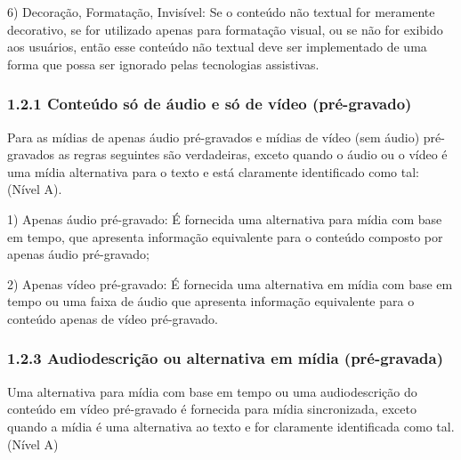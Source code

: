 \documentclass[a4paper]{article}
\begin{document}
\begin{titlepage}
\hspace{.1\textwidth} %
\begin{minipage}{.85\textwidth}
	6) Decoração, Formatação, Invisível: Se o conteúdo não textual for meramente decorativo, se for utilizado apenas para formatação visual, ou se não for exibido aos usuários, então esse conteúdo não textual deve ser implementado de uma forma que possa ser ignorado pelas tecnologias assistivas.\\
\end{minipage}

\subsubsection{1.2.1 Conteúdo só de áudio e só de vídeo (pré-gravado)}

Para as mídias de apenas áudio pré-gravados e mídias de vídeo (sem áudio) pré-gravados as regras seguintes são verdadeiras, exceto quando o áudio ou o vídeo é uma mídia alternativa para o texto e está claramente identificado como tal: (Nível A).\\

\hspace{.1\textwidth} %
\begin{minipage}{.85\textwidth}
	1) Apenas áudio pré-gravado: É fornecida uma alternativa para mídia com base em tempo, que apresenta informação equivalente para o conteúdo composto por apenas áudio pré-gravado;\\
\end{minipage}

\hspace{.1\textwidth} %
\begin{minipage}{.85\textwidth}
	2) Apenas vídeo pré-gravado: É fornecida uma alternativa em mídia com base em tempo ou uma faixa de áudio que apresenta informação equivalente para o conteúdo apenas de vídeo pré-gravado.
\end{minipage}
\subsubsection{1.2.3 Audiodescrição ou alternativa em mídia (pré-gravada)}

Uma alternativa para mídia com base em tempo ou uma audiodescrição do conteúdo em vídeo pré-gravado é fornecida para mídia sincronizada, exceto quando a mídia é uma alternativa ao texto e for claramente identificada como tal. (Nível A)


\end{titlepage}
\end{document}
